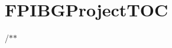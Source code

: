 \chapter{FPIBGProject\+TOC}
\hypertarget{md__x_1_2_d_o_c_i_n_2_f_p_i_b_g_project_t_o_c}{}\label{md__x_1_2_d_o_c_i_n_2_f_p_i_b_g_project_t_o_c}
/\texorpdfstring{$\ast$}{*}\texorpdfstring{$\ast$}{*} 